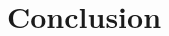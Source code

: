 \documentclass[twocolumn]{phdsymp} %
\begin{document}
\section{Conclusion}

\nocite{*}



%
\begin{thebibliography}{1}
\end{thebibliography}
%
\end{document}
